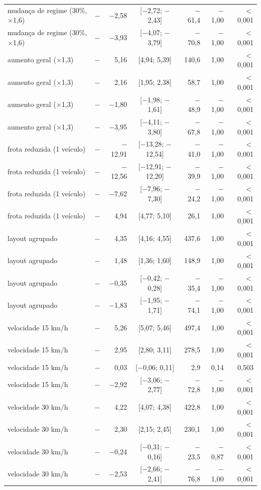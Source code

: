 \begin{tabular}{@{}llrcrrr@{}}
mudança de regime (30\%, $\times$1,6) & \polD{} $-$ \polA{} & $-$2,58 & [$-$2,72; $-$2,43] & $-$61,4 & $-$1,00 & $<$0,001 \\
mudança de regime (30\%, $\times$1,6) & \polD{} $-$ \polC{} & $-$3,93 & [$-$4,07; $-$3,79] & $-$70,8 & $-$1,00 & $<$0,001 \\
aumento geral ($\times$1,3) & \polBOR{} $-$ \polA{} & 5,16 & [4,94; 5,39] & 140,6 & 1,00 & $<$0,001 \\
aumento geral ($\times$1,3) & \polC{} $-$ \polA{} & 2,16 & [1,95; 2,38] & 58,7 & 1,00 & $<$0,001 \\
aumento geral ($\times$1,3) & \polD{} $-$ \polA{} & $-$1,80 & [$-$1,98; $-$1,61] & $-$48,9 & $-$1,00 & $<$0,001 \\
aumento geral ($\times$1,3) & \polD{} $-$ \polC{} & $-$3,95 & [$-$4,11; $-$3,80] & $-$67,8 & $-$1,00 & $<$0,001 \\
frota reduzida (1 veículo) & \polBOR{} $-$ \polA{} & $-$12,91 & [$-$13,28; $-$12,54] & $-$41,0 & $-$1,00 & $<$0,001 \\
frota reduzida (1 veículo) & \polC{} $-$ \polA{} & $-$12,56 & [$-$12,91; $-$12,20] & $-$39,9 & $-$1,00 & $<$0,001 \\
frota reduzida (1 veículo) & \polD{} $-$ \polA{} & $-$7,62 & [$-$7,96; $-$7,30] & $-$24,2 & $-$1,00 & $<$0,001 \\
frota reduzida (1 veículo) & \polD{} $-$ \polC{} & 4,94 & [4,77; 5,10] & 26,1 & 1,00 & $<$0,001 \\
layout agrupado & \polBOR{} $-$ \polA{} & 4,35 & [4,16; 4,55] & 437,6 & 1,00 & $<$0,001 \\
layout agrupado & \polC{} $-$ \polA{} & 1,48 & [1,36; 1,60] & 148,9 & 1,00 & $<$0,001 \\
layout agrupado & \polD{} $-$ \polA{} & $-$0,35 & [$-$0,42; $-$0,28] & $-$35,4 & $-$1,00 & $<$0,001 \\
layout agrupado & \polD{} $-$ \polC{} & $-$1,83 & [$-$1,95; $-$1,71] & $-$74,1 & $-$1,00 & $<$0,001 \\
velocidade 15 km/h & \polBOR{} $-$ \polA{} & 5,26 & [5,07; 5,46] & 497,4 & 1,00 & $<$0,001 \\
velocidade 15 km/h & \polC{} $-$ \polA{} & 2,95 & [2,80; 3,11] & 278,5 & 1,00 & $<$0,001 \\
velocidade 15 km/h & \polD{} $-$ \polA{} & 0,03 & [$-$0,06; 0,11] & 2,9 & 0,14 & 0,503 \\
velocidade 15 km/h & \polD{} $-$ \polC{} & $-$2,92 & [$-$3,06; $-$2,77] & $-$72,8 & $-$1,00 & $<$0,001 \\
velocidade 30 km/h & \polBOR{} $-$ \polA{} & 4,22 & [4,07; 4,38] & 422,8 & 1,00 & $<$0,001 \\
velocidade 30 km/h & \polC{} $-$ \polA{} & 2,30 & [2,15; 2,45] & 230,1 & 1,00 & $<$0,001 \\
velocidade 30 km/h & \polD{} $-$ \polA{} & $-$0,24 & [$-$0,31; $-$0,16] & $-$23,5 & $-$0,87 & $<$0,001 \\
velocidade 30 km/h & \polD{} $-$ \polC{} & $-$2,53 & [$-$2,66; $-$2,41] & $-$76,8 & $-$1,00 & $<$0,001 \\
\bottomrule
\end{tabular}
